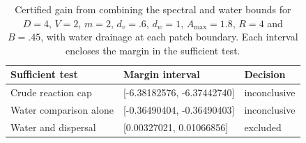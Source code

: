 \begin{table}[htbp]
\centering
\caption{Certified gain from combining the spectral and water bounds for $D=4$, $V=2$, $m=2$, $d_v=.6$, $d_w=1$, $A_{\max}=1.8$, $R=4$ and $B=.45$, with water drainage at each patch boundary. Each interval encloses the margin in the sufficient test.}
\label{tab:water_synergy}
\begin{tabular}{lll}
\toprule
Sufficient test & Margin interval & Decision \\
\midrule
Crude reaction cap & [-6.38182576, -6.37442740] & inconclusive \\
Water comparison alone & [-0.36490404, -0.36490403] & inconclusive \\
Water and dispersal & [0.00327021, 0.01066856] & excluded \\
\bottomrule
\end{tabular}
\end{table}
